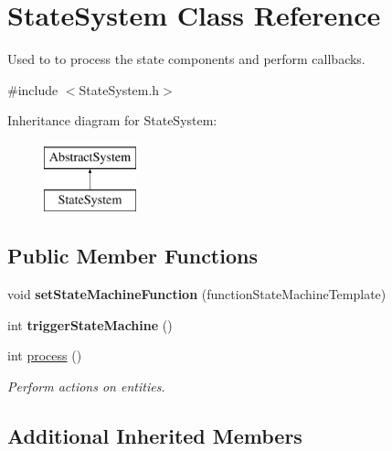 \hypertarget{class_state_system}{\section{State\-System Class Reference}
\label{df/d94/class_state_system}
}


Used to to process the state components and perform callbacks.  




{\ttfamily \#include $<$State\-System.\-h$>$}

Inheritance diagram for State\-System\-:\begin{figure}[H]
\begin{center}
\leavevmode
\includegraphics[height=2.000000cm]{df/d94/class_state_system}
\end{center}
\end{figure}
\subsection*{Public Member Functions}
\begin{DoxyCompactItemize}
\item 
\hypertarget{class_state_system_a437f4d0bc0e24713e582a635b83ec365}{void {\bfseries set\-State\-Machine\-Function} (function\-State\-Machine\-Template)}\label{df/d94/class_state_system_a437f4d0bc0e24713e582a635b83ec365}

\item 
\hypertarget{class_state_system_a97c35c1215cca9cf897770777f2ef0f1}{int {\bfseries trigger\-State\-Machine} ()}\label{df/d94/class_state_system_a97c35c1215cca9cf897770777f2ef0f1}

\item 
int \hyperlink{class_state_system_acd4ff634e180a921f3d40448cff994ca}{process} ()
\begin{DoxyCompactList}\small\item\em Perform actions on entities. \end{DoxyCompactList}\end{DoxyCompactItemize}
\subsection*{Additional Inherited Members}


